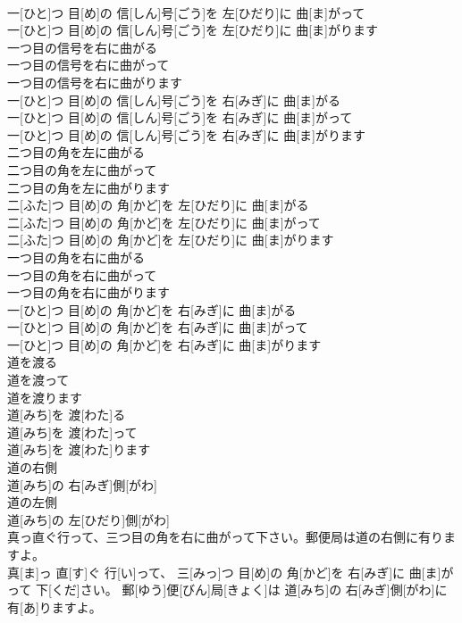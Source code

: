 \documentclass[8pt]{extreport}
\begin{document}
\begin{CJK}{UTF8}{min}
\\	一[ひと]つ 目[め]の 信[しん]号[ごう]を 左[ひだり]に 曲[ま]がって 
\\	一[ひと]つ 目[め]の 信[しん]号[ごう]を 左[ひだり]に 曲[ま]がります
\\	一つ目の信号を右に曲がる 
\\	一つ目の信号を右に曲がって 
\\	一つ目の信号を右に曲がります	
\\	一[ひと]つ 目[め]の 信[しん]号[ごう]を 右[みぎ]に 曲[ま]がる 
\\	一[ひと]つ 目[め]の 信[しん]号[ごう]を 右[みぎ]に 曲[ま]がって 
\\	一[ひと]つ 目[め]の 信[しん]号[ごう]を 右[みぎ]に 曲[ま]がります
\\	二つ目の角を左に曲がる 
\\	二つ目の角を左に曲がって 
\\	二つ目の角を左に曲がります	
\\	二[ふた]つ 目[め]の 角[かど]を 左[ひだり]に 曲[ま]がる 
\\	二[ふた]つ 目[め]の 角[かど]を 左[ひだり]に 曲[ま]がって 
\\	二[ふた]つ 目[め]の 角[かど]を 左[ひだり]に 曲[ま]がります
\\	一つ目の角を右に曲がる 
\\	一つ目の角を右に曲がって 
\\	一つ目の角を右に曲がります	
\\	一[ひと]つ 目[め]の 角[かど]を 右[みぎ]に 曲[ま]がる 
\\	一[ひと]つ 目[め]の 角[かど]を 右[みぎ]に 曲[ま]がって 
\\	一[ひと]つ 目[め]の 角[かど]を 右[みぎ]に 曲[ま]がります
\\	道を渡る 
\\	道を渡って 
\\	道を渡ります	
\\	道[みち]を 渡[わた]る 
\\	道[みち]を 渡[わた]って 
\\	道[みち]を 渡[わた]ります
\\	道の右側	
\\	道[みち]の 右[みぎ]側[がわ]	
\\	道の左側	
\\	道[みち]の 左[ひだり]側[がわ]	
\\	真っ直ぐ行って、三つ目の角を右に曲がって下さい。郵便局は道の右側に有りますよ。	
\\	真[ま]っ 直[す]ぐ 行[い]って、 三[みっ]つ 目[め]の 角[かど]を 右[みぎ]に 曲[ま]がって 下[くだ]さい。 郵[ゆう]便[びん]局[きょく]は 道[みち]の 右[みぎ]側[がわ]に 有[あ]りますよ。

\end{CJK}
\end{document}
